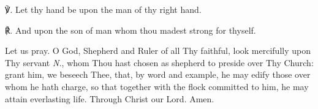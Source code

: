 \begin{otherlanguage}{english}℣. Let thy hand be upon the man of thy right hand.

℟. And upon the son of man whom thou madest strong for thyself.

Let us pray. O God, Shepherd and Ruler of all Thy faithful, look mercifully upon Thy servant  \textit{N.}, whom Thou hast chosen as shepherd to preside over Thy Church: grant him, we beseech Thee, that, by word and example, he may edify those over whom he hath charge, so that together with the flock committed to him, he may attain everlasting life. Through Christ our Lord. Amen.

\end{otherlanguage}